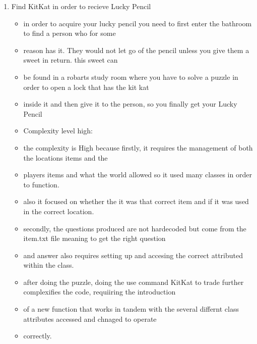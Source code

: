 \documentclass[11pt]{article}
\begin{document}
\begin{enumerate}
\item Find KitKat in order to recieve Lucky Pencil
	\begin{itemize}
	\item in order to acquire your lucky pencil you need to first enter the bathroom to find a person who for some
	\item reason has it. They would not let go of the pencil unless you give them a sweet in return. this sweet can
	\item be found in a robarts study room where you have to solve a puzzle in order to open a lock that has the kit kat
	\item inside it and then give it to the person, so you finally get your Lucky Pencil
	\item Complexity level high:
	\item the complexity is High because firstly, it requires the management of both the locations items and the
	\item players items and what the world allowed so it used many classes in order to function.
	\item also it focused on whether the it was that correct item and if it was used in the correct location.
	\item secondly, the questions produced are not hardecoded but come from the item.txt file meaning to get the right question
	\item and answer also requires setting up and accesing the correct attributed within the class.
	\item after doing the puzzle, doing the use command KitKat to trade further complexifies the code, requiiring the introduction
	\item of a new function that works in tandem with the several differnt class attributes accessed and chnaged to operate
	\item correctly.
	\end{itemize}


\end{enumerate}
\end{document}
